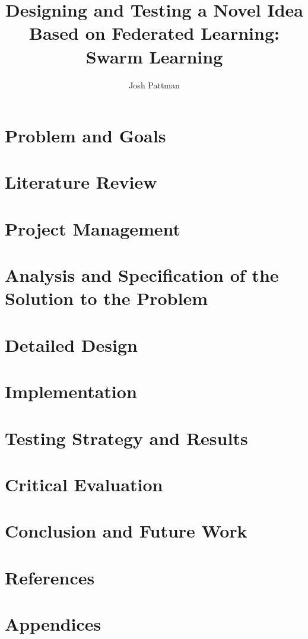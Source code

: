 \documentclass[12pt,a4paper]{report}
\author{Josh Pattman}
\title{Designing and Testing a Novel Idea Based on Federated Learning: Swarm Learning}
\begin{document}
	\maketitle
	\tableofcontents
	\chapter{Problem and Goals}
	\chapter{Literature Review}
	\chapter{Project Management}
	\chapter{Analysis and Specification of the Solution to the Problem}
	\chapter{Detailed Design}
	
	
	\chapter{Implementation}
	
	
	\chapter{Testing Strategy and Results}
	
	
	\chapter{Critical Evaluation}
	\chapter{Conclusion and Future Work}
	\chapter{References}
	\chapter{Appendices}
	
\end{document}
